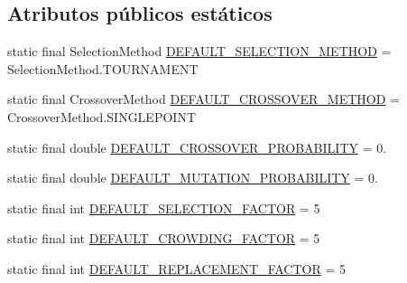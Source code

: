 \subsection*{Atributos públicos estáticos}
\begin{DoxyCompactItemize}
\item 
static final Selection\-Method \hyperlink{classjenes_1_1stage_1_1operator_1_1common_1_1_multi_niche_crowder_3_01_t_01extends_01_chromosome_01_4_addd3f5fe352248ed9d5639e0d138f59d}{D\-E\-F\-A\-U\-L\-T\-\_\-\-S\-E\-L\-E\-C\-T\-I\-O\-N\-\_\-\-M\-E\-T\-H\-O\-D} = Selection\-Method.\-T\-O\-U\-R\-N\-A\-M\-E\-N\-T
\item 
static final Crossover\-Method \hyperlink{classjenes_1_1stage_1_1operator_1_1common_1_1_multi_niche_crowder_3_01_t_01extends_01_chromosome_01_4_aed986ca7d89144f78e73a11a5fb2f032}{D\-E\-F\-A\-U\-L\-T\-\_\-\-C\-R\-O\-S\-S\-O\-V\-E\-R\-\_\-\-M\-E\-T\-H\-O\-D} = Crossover\-Method.\-S\-I\-N\-G\-L\-E\-P\-O\-I\-N\-T
\item 
static final double \hyperlink{classjenes_1_1stage_1_1operator_1_1common_1_1_multi_niche_crowder_3_01_t_01extends_01_chromosome_01_4_a6e6d3f4e8201a341f77ac92954dbdad4}{D\-E\-F\-A\-U\-L\-T\-\_\-\-C\-R\-O\-S\-S\-O\-V\-E\-R\-\_\-\-P\-R\-O\-B\-A\-B\-I\-L\-I\-T\-Y} = 0.
\item 
static final double \hyperlink{classjenes_1_1stage_1_1operator_1_1common_1_1_multi_niche_crowder_3_01_t_01extends_01_chromosome_01_4_aa3cfe11747630124e10809b0027d6f3a}{D\-E\-F\-A\-U\-L\-T\-\_\-\-M\-U\-T\-A\-T\-I\-O\-N\-\_\-\-P\-R\-O\-B\-A\-B\-I\-L\-I\-T\-Y} = 0.
\item 
static final int \hyperlink{classjenes_1_1stage_1_1operator_1_1common_1_1_multi_niche_crowder_3_01_t_01extends_01_chromosome_01_4_a937e501fc953576f30be99a0eec9ccf4}{D\-E\-F\-A\-U\-L\-T\-\_\-\-S\-E\-L\-E\-C\-T\-I\-O\-N\-\_\-\-F\-A\-C\-T\-O\-R} = 5
\item 
static final int \hyperlink{classjenes_1_1stage_1_1operator_1_1common_1_1_multi_niche_crowder_3_01_t_01extends_01_chromosome_01_4_ae7c682fcbb8e1de5270d79ca482bd93d}{D\-E\-F\-A\-U\-L\-T\-\_\-\-C\-R\-O\-W\-D\-I\-N\-G\-\_\-\-F\-A\-C\-T\-O\-R} = 5
\item 
static final int \hyperlink{classjenes_1_1stage_1_1operator_1_1common_1_1_multi_niche_crowder_3_01_t_01extends_01_chromosome_01_4_ac38d4afc42b5f54473834e76815c7510}{D\-E\-F\-A\-U\-L\-T\-\_\-\-R\-E\-P\-L\-A\-C\-E\-M\-E\-N\-T\-\_\-\-F\-A\-C\-T\-O\-R} = 5
\end{DoxyCompactItemize}
